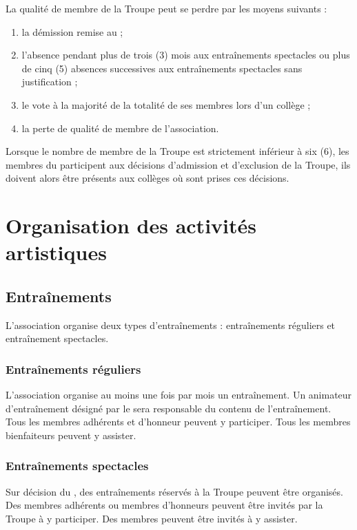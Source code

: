 \documentclass[a4paper,french,10pt]{article}
\begin{document}
La qualité de membre de la Troupe peut se perdre par les moyens suivants :

\begin{enumerate}
	\item la démission remise au \DA{} ;
	\item l'absence pendant plus de trois  (3) mois aux entraînements spectacles ou plus de cinq (5) absences successives aux entraînements spectacles sans justification ;
	\item le vote à la majorité de la totalité de ses membres lors d'un collège ;
	\item la perte de qualité de membre de l'association.

\end{enumerate}

Lorsque le nombre de membre de la Troupe est strictement inférieur à six (6), les membres du \bureau{} participent aux décisions d'admission et d'exclusion de la Troupe, ils doivent alors être présents aux collèges où sont prises ces décisions.

\section{Organisation des activités artistiques}
\subsection{Entraînements}
L'association organise deux types d'entraînements : entraînements réguliers et entraînement spectacles.

\subsubsection{Entraînements réguliers}
L'association organise au moins une fois par mois un entraînement. Un animateur d'entraînement désigné par le \DA{} sera responsable du contenu de l'entraînement. Tous les membres adhérents et d'honneur peuvent y participer. Tous les membres bienfaiteurs peuvent y assister.

\subsubsection{Entraînements spectacles}
Sur décision du \DA{}, des entraînements réservés à la Troupe peuvent être organisés. Des membres adhérents ou membres d'honneurs peuvent être invités par la Troupe à y participer. Des membres peuvent être invités à y assister.
\end{document}
